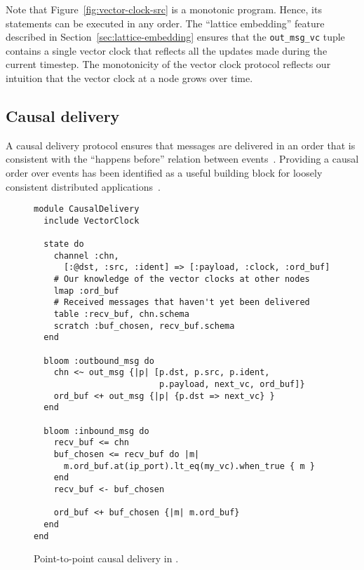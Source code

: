 Note that Figure~\ref{fig:vector-clock-src} is a monotonic program. Hence, its
statements can be executed in any order. The ``lattice embedding'' feature
described in Section~\ref{sec:lattice-embedding} ensures that the
\texttt{out\_msg\_vc} tuple contains a single vector clock that reflects all the
updates made during the current timestep. The monotonicity of the vector clock
protocol reflects our intuition that the vector clock at a node grows over
time.%

\subsection{Causal delivery}
A causal delivery protocol ensures that messages are delivered in an order that
is consistent with the ``happens before'' relation between
events~\cite{Lamport1978}. Providing a causal order over events has been
identified as a useful building block for loosely consistent distributed
applications~\cite{Lloyd2011}.

\begin{figure}[t]
\begin{scriptsize}
\begin{lstlisting}
module CausalDelivery
  include VectorClock

  state do
    channel :chn,
      [:@dst, :src, :ident] => [:payload, :clock, :ord_buf]
    # Our knowledge of the vector clocks at other nodes
    lmap :ord_buf
    # Received messages that haven't yet been delivered
    table :recv_buf, chn.schema
    scratch :buf_chosen, recv_buf.schema
  end

  bloom :outbound_msg do
    chn <~ out_msg {|p| [p.dst, p.src, p.ident,
                         p.payload, next_vc, ord_buf]}
    ord_buf <+ out_msg {|p| {p.dst => next_vc} }
  end

  bloom :inbound_msg do
    recv_buf <= chn
    buf_chosen <= recv_buf do |m|
      m.ord_buf.at(ip_port).lt_eq(my_vc).when_true { m }
    end
    recv_buf <- buf_chosen

    ord_buf <+ buf_chosen {|m| m.ord_buf}
  end
end
\end{lstlisting}
\end{scriptsize}
\caption{Point-to-point causal delivery in \lang.}
\label{fig:causal-delivery-src}
\end{figure}
